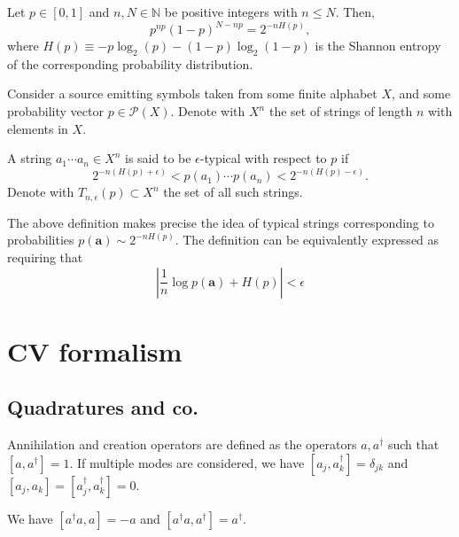 \documentclass[12pt]{report}
\newcommand{\NN}{\mathbb{N}}
\newcommand{\bs}[1]{\boldsymbol{#1}}
\newcommand{\calP}{{\mathcal{P}}}
\begin{document}
\begin{prop}
	Let $p\in[0,1]$ and $n,N\in\NN$ be positive integers with $n\le N$.
	Then,
	\begin{equation}
		p^{np} (1-p)^{N-np}
		= 2^{-nH(p)},
	\end{equation}
	where $H(p)\equiv -p\log_2(p)-(1-p)\log_2(1-p)$ is the Shannon entropy of the corresponding probability distribution.
\end{prop}

Consider a source emitting symbols taken from some finite alphabet $X$, and some probability vector $p\in \calP(X)$.
Denote with $X^n$ the set of strings of length $n$ with elements in $X$.

\begin{defn}
	A string $a_1\cdots a_n\in X^n$ is said to be $\epsilon$-typical with respect to $p$ if
	\begin{equation}
		2^{-n(H(p)+\epsilon)} < p(a_1)\cdots p(a_n) < 2^{-n(H(p)-\epsilon)}.
	\end{equation}
	Denote with $T_{n,\epsilon}(p)\subset X^n$ the set of all such strings.
\end{defn}

The above definition makes precise the idea of typical strings corresponding to probabilities $p(\bs a)\sim 2^{-nH(p)}$.
The definition can be equivalently expressed as requiring that
\begin{equation}
	\left\lvert \frac{1}{n}\log p(\bs a) + H(p) \right\rvert < \epsilon
\end{equation}

\chapter{CV formalism}
\minitoc

\section{Quadratures and co.}

\begin{defn}
	Annihilation and creation operators are defined as the operators $a,a^\dagger$ such that $[a,a^\dagger]=1$.
	If multiple modes are considered, we have $[a_j,a_k^\dagger]=\delta_{jk}$ and $[a_j,a_k]=[a_j^\dagger,a_k^\dagger]=0$.
\end{defn}

\begin{prop}
	We have $[a^\dagger a, a] = -a$ and
	$[a^\dagger a, a^\dagger] = a^\dagger$.
\end{prop}
\end{document}

